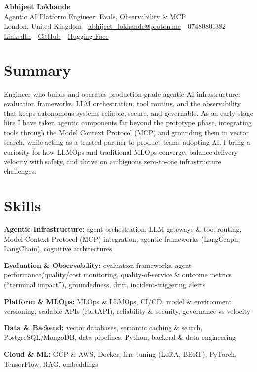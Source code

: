 \documentclass[10pt,a4paper]{article}
\newcommand{\sep}{\,\textcolor{accent!60}{\textbar}\,}
\begin{document}
\begin{center}
  {\fontsize{24}{26}\selectfont\bfseries Abhijeet Lokhande}\\[3pt]
  {\color{accent}\large Agentic AI Platform Engineer: Evals, Observability \& MCP}\\[5pt]
  {\small
    London, United Kingdom \sep
    \href{mailto:abhijeet_lokhande@proton.me}{abhijeet\_lokhande@proton.me} \sep
    07480801382 \\[2pt]
    \href{https://www.linkedin.com/in/ablds/}{LinkedIn} \sep
    \href{https://github.com/abhijeetscode}{GitHub} \sep
    \href{https://huggingface.co/ab-ai}{Hugging Face}
  }
\end{center}
\vspace{2pt}

\section{Summary}
Engineer who builds and operates production-grade agentic AI infrastructure: evaluation frameworks, LLM orchestration, tool routing, and the observability that keeps autonomous systems reliable, secure, and governable. As an early-stage hire I have taken agentic components far beyond the prototype phase, integrating tools through the Model Context Protocol (MCP) and grounding them in vector search, while acting as a trusted partner to product teams adopting AI. I bring a curiosity for how LLMOps and traditional MLOps converge, balance delivery velocity with safety, and thrive on ambiguous zero-to-one infrastructure challenges.

\section{Skills}
\begin{tight}
  \item[\textcolor{accent}{\small$\bullet$}] \textbf{Agentic Infrastructure:} agent orchestration, LLM gateways \& tool routing, Model Context Protocol (MCP) integration, agentic frameworks (LangGraph, LangChain), cognitive architectures
  \item[\textcolor{accent}{\small$\bullet$}] \textbf{Evaluation \& Observability:} evaluation frameworks, agent performance/quality/cost monitoring, quality-of-service \& outcome metrics (``terminal impact''), groundedness, drift, incident-triggering alerts
  \item[\textcolor{accent}{\small$\bullet$}] \textbf{Platform \& MLOps:} MLOps \& LLMOps, CI/CD, model \& environment versioning, scalable APIs (FastAPI), reliability \& security, governance vs velocity
  \item[\textcolor{accent}{\small$\bullet$}] \textbf{Data \& Backend:} vector databases, semantic caching \& search, PostgreSQL/MongoDB, data pipelines, Python, backend \& data engineering
  \item[\textcolor{accent}{\small$\bullet$}] \textbf{Cloud \& ML:} GCP \& AWS, Docker, fine-tuning (LoRA, BERT), PyTorch, TensorFlow, RAG, embeddings
\end{tight}
\end{document}
